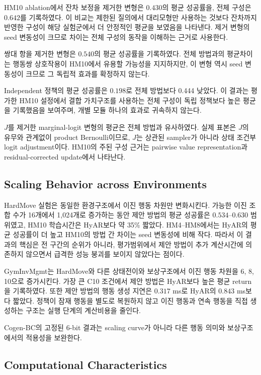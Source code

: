 \documentclass[10pt,journal]{IEEEtran}
\begin{document}
HM10 ablation에서 잔차 보정을 제거한 변형은 $0.430$의 평균 성공률을, 전체 구성은 $0.642$를 기록하였다. 이 비교는 제한된 질의에서 대리모형만 사용하는 것보다 잔차까지 반영한 구성이 해당 실험군에서 더 안정적인 평균을 보였음을 나타낸다. 제거 변형의 seed 변동성이 크므로 차이는 전체 구성의 동작을 이해하는 근거로 사용한다.

쌍대 항을 제거한 변형은 $0.540$의 평균 성공률을 기록하였다. 전체 방법과의 평균차이는 행동쌍 상호작용이 HM10에서 유용할 가능성을 지지하지만, 이 변형 역시 seed 변동성이 크므로 그 독립적 효과를 확정하지 않는다.

Independent 정책의 평균 성공률은 $0.198$로 전체 방법보다 0.444 낮았다. 이 결과는 평가한 HM10 설정에서 결합 가치구조를 사용하는 전체 구성이 독립 정책보다 높은 평균을 기록했음을 보여주며, 개별 모듈 하나의 효과로 귀속하지 않는다.

$J$를 제거한 marginal-logit 변형의 평균은 전체 방법과 유사하였다. 실제 표본은 $J$의 유무와 관계없이 product Bernoulli이므로, $J$는 상관된 sampler가 아니라 상태 조건부 logit adjustment이다. HM10의 주된 구성 근거는 pairwise value representation과 residual-corrected update에서 나타난다.


\subsection{Scaling Behavior across Environments}

HardMove 실험은 동일한 환경구조에서 이진 행동 차원만 변화시킨다. 가능한 이진 조합 수가 16개에서 1,024개로 증가하는 동안 제안 방법의 평균 성공률은 $0.534$--$0.630$ 범위였고, HM10 학습시간은 HyAR보다 약 35\% 짧았다. HM4--HM8에서는 HyAR의 평균 성공률이 더 높고 HM10의 방법 간 차이는 seed 변동성에 비해 작다. 따라서 이 결과의 핵심은 전 구간의 순위가 아니라, 평가범위에서 제안 방법이 추가 계산시간에 의존하지 않으면서 급격한 성능 붕괴를 보이지 않았다는 점이다.

GymInvMgmt는 HardMove와 다른 상태전이와 보상구조에서 이진 행동 차원을 6, 8, 10으로 증가시킨다. 가장 큰 C10 조건에서 제안 방법은 HyAR보다 높은 평균 return을 기록하였다. 또한 제안 방법의 행동 생성 지연은 $0.317$ ms로 HyAR의 $0.843$ ms보다 짧았다. 정책이 잠재 행동을 별도로 복원하지 않고 이진 행동과 연속 행동을 직접 생성하는 구조는 실행 단계의 계산비용을 줄인다.

Cogen-BC의 고정된 6-bit 결과는 scaling curve가 아니라 다른 행동 의미와 보상구조에서의 적용성을 보완한다.


\subsection{Computational Characteristics}
\end{document}
